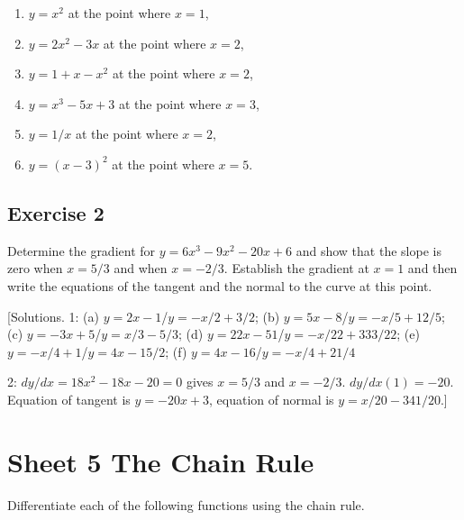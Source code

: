 \documentclass[
  11pt,
  oneside]{book}
\providecommand{\tightlist}{%
  \setlength{\itemsep}{0pt}\setlength{\parskip}{0pt}}
\newcommand{\slide}{}
\theoremstyle{definition}
\theoremstyle{definition}
\theoremstyle{definition}
\theoremstyle{definition}
\theoremstyle{remark}
\begin{document}
\begin{enumerate}
\def\labelenumi{\alph{enumi}.}
\tightlist
\item
  \(y=x^2\) at the point where \(x=1\),
\item
  \(y=2x^2-3x\) at the point where \(x=2\),
\item
  \(y=1+x-x^2\) at the point where \(x=2\),
\item
  \(y=x^3-5x+3\) at the point where \(x=3\),
\item
  \(y=1/x\) at the point where \(x=2\),
\item
  \(y=(x-3)^2\) at the point where \(x=5\).
\end{enumerate}

\slide

\subsection*{Exercise 2}\label{exercise-2-1}

Determine the gradient for \(y=6x^3-9x^2-20x+6\) and show that the slope is zero when \(x=5/3\) and when \(x=-2/3\). Establish the gradient at \(x=1\) and then write the equations of the tangent and the normal to the curve at this point.

\slide

{[}Solutions. 1: (a) \(y=2x-1\)/\(y=-x/2+3/2\); (b) \(y=5x-8\)/\(y=-x/5+12/5\); (c) \(y=-3x+5\)/\(y=x/3-5/3\); (d) \(y=22x-51\)/\(y=-x/22+333/22\); (e) \(y=-x/4+1\)/\(y=4x-15/2\); (f) \(y=4x-16\)/\(y=-x/4+21/4\)

2: \(dy/dx = 18x^2-18x-20 = 0\) gives \(x=5/3\) and \(x=-2/3\). \(dy/dx(1) = -20\). Equation of tangent is \(y=-20x+3\), equation of normal is \(y=x/20-341/20\).{]}

\slide

\section{Sheet 5 The Chain Rule}\label{sheet-5-the-chain-rule}

Differentiate each of the following functions using the chain rule.
\end{document}
